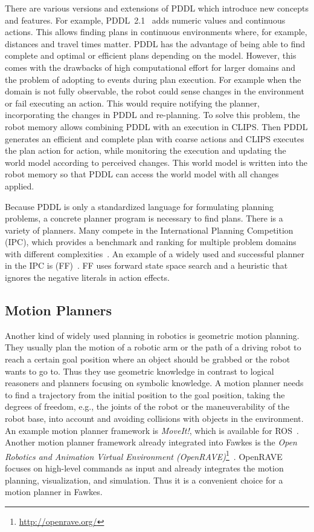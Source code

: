 There are various versions and extensions of PDDL which introduce new
concepts and features. For example, PDDL~2.1~\cite{PDDL2.1} adds
numeric values and continuous actions. This allows finding plans in
continuous environments where, for example, distances and travel times
matter. PDDL has the advantage of being able to find complete and
optimal or efficient plans depending on the model. However, this comes
with the drawbacks of high computational effort for larger domains and
the problem of adopting to events during plan execution. For example
when the domain is not fully observable, the robot could sense changes
in the environment or fail executing an action. This would require
notifying the planner, incorporating the changes in PDDL and
re-planning. To solve this problem, the robot memory allows
combining PDDL with an execution in CLIPS. Then PDDL generates an
efficient and complete plan with coarse actions and CLIPS executes the
plan action for action, while monitoring the execution and updating
the world model according to perceived changes. This world model is
written into the robot memory so that PDDL can access the world model
with all changes applied.  %

Because PDDL is only a standardized language for formulating planning
problems, a concrete planner program is necessary to find plans. There
is a variety of planners. Many compete in the International
Planning Competition (IPC), which provides a benchmark and ranking for
multiple problem domains with different
complexities~\cite{planning-competition}. An example of a widely used
and successful planner in the IPC is (FF)~\cite{hoffmannFF}. FF uses
forward state space search and a heuristic that ignores the negative
literals in action effects.

\subsection{Motion Planners}
Another kind of widely used planning in robotics is geometric motion
planning. They usually plan the motion of a robotic arm or the path of
a driving robot to reach a certain goal position where an object
should be grabbed or the robot wants to go to. Thus they use geometric
knowledge in contrast to logical reasoners and planners focusing on
symbolic knowledge.  A motion planner needs to find a trajectory from
the initial position to the goal position, taking the degrees of
freedom, e.g., the joints of the robot or the maneuverability of the
robot base, into account and avoiding collisions with objects in the
environment. An example motion planner framework is \emph{MoveIt!},
which is available for ROS~\cite{MoveIt}. Another motion planner
framework already integrated into Fawkes is the \emph{Open Robotics
  and Animation Virtual Environment
  (OpenRAVE)}\footnote{\url{http://openrave.org/}}~\cite{OpenRave}. OpenRAVE
focuses on high-level commands as input and already integrates the
motion planning, visualization, and simulation. Thus it is a
convenient choice for a motion planner in Fawkes.

